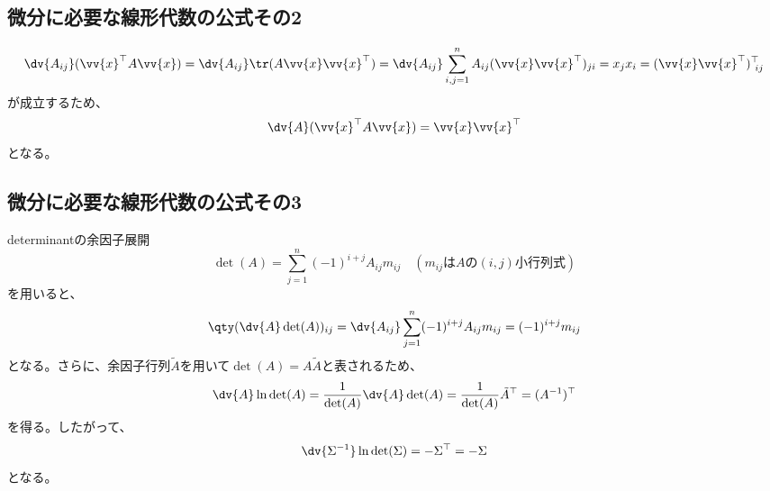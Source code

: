 \documentclass[a4paper,11pt,uplatex]{jsarticle}%
\begin{document}
\subsection{微分に必要な線形代数の公式その2}
\begin{equation}
  \dv{A_{ij}}(\vv{x}^{\top}A\vv{x})  = \dv{A_{ij}}\tr(A\vv{x}\vv{x}^{\top})
  = \dv{A_{ij}}\sum_{i,j=1}^{n}A_{ij}(\vv{x}\vv{x}^{\top})_{ji} = x_jx_i = (\vv{x}\vv{x}^{\top})^{\top}_{~ij}
\end{equation}
が成立するため、
\begin{equation}
  \dv{A}(\vv{x}^{\top}A\vv{x})  = \vv{x}\vv{x}^{\top}
\end{equation}
となる。
\subsection{微分に必要な線形代数の公式その3}
determinantの余因子展開
\begin{equation}
  \det(A) = \sum_{j=1}^{n}(-1)^{i+j}A_{ij}m_{ij}\quad(m_{ij}\text{は$A\text{の}(i,j)$小行列式})
\end{equation}
を用いると、
\begin{equation}
  \qty(\dv{A}\det(A))_{ij} = \dv{A_{ij}}\sum_{j=1}^{n}(-1)^{i+j}A_{ij}m_{ij}=(-1)^{i+j}m_{ij}
\end{equation}
となる。さらに、余因子行列$\tilde{A}$を用いて$\det(A) = A\tilde{A}$と表されるため、
\begin{equation}
  \dv{A}\ln{\det(A)} = \frac{1}{\det(A)}\dv{A}\det(A) = \frac{1}{\det(A)}\tilde{A}^{\top} = (A^{-1})^{\top}
\end{equation}
を得る。したがって、
\begin{equation}
  \dv{\Sigma^{-1}}\ln{\det(\Sigma)} = -\Sigma^{\top} = -\Sigma
\end{equation}
となる。
\end{document}
